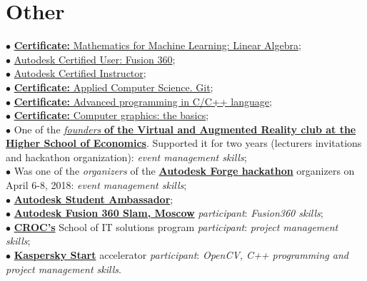 \documentclass[]{cv-class}
\begin{document}
\begin{minipage}[t]{0.6\textwidth}
\section{Other}
    \textcolor{bullet_col}{$\bullet$} \href{https://www.coursera.org/account/accomplishments/certificate/APDHC473Q5H7}{\textbf{Certificate:} Mathematics for Machine Learning: Linear Algebra}; \\
    \textcolor{bullet_col}{$\bullet$} \href{https://www.youracclaim.com/badges/e136c126-c834-408b-b380-beaa949e9180/public_url}{Autodesk Certified User: Fusion 360}; \\
    \textcolor{bullet_col}{$\bullet$} \href{https://www.youracclaim.com/badges/c0436850-b62e-45b4-95fa-6f1b49ca56b6/public_url}{Autodesk Certified Instructor}; \\
    \textcolor{bullet_col}{$\bullet$} \href{https://stepik.org/certificate/86b5b40faf74372730b30f98272ef8a9640ad069.pdf}{\textbf{Certificate:} Applied Computer Science. Git}; \\
    \textcolor{bullet_col}{$\bullet$} \href{https://stepik.org/certificate/93a178ba1662133d84ddb47bed17106eb4a4c8b2.pdf}{\textbf{Certificate:} Advanced programming in C/C++ language}; \\
    \textcolor{bullet_col}{$\bullet$} \href{https://stepik.org/certificate/ffb76dc11c287a0219ffb3e5aee43d2a104bcbb6.pdf}{\textbf{Certificate:} Computer graphics: the basics}; \\
    

    \textcolor{bullet_col}{$\bullet$} One of the \href{http://family.hse.ru/stud/view/391}{\textit{founders} \textbf{of the Virtual and Augmented Reality club at the Higher School of Economics}}. Supported it for two years (lecturers invitations and hackathon organization): \textit{event management skills}; \\
    \textcolor{bullet_col}{$\bullet$} Was one of the \textit{organizers} of the \href{https://www.hse.ru/ba/am/news/218387792.html}{\textbf{Autodesk Forge hackathon}} organizers on April 6-8, 2018: \textit{event management skills}; \\
    \textcolor{bullet_col}{$\bullet$} \href{https://academy.autodesk.com/users/n1kkys}{\textbf{Autodesk Student Ambassador}}; \\
    \textcolor{bullet_col}{$\bullet$} \href{https://youtu.be/k5R8RdXaOq4}{\textbf{Autodesk Fusion 360 Slam, Moscow}} \textit{participant}: \textit{Fusion360 skills}; \\
    \textcolor{bullet_col}{$\bullet$} \href{https://www.croc.ru/eng/}{\textbf{CROC's}} School of IT solutions program \textit{participant}: \textit{project management skills}; \\
    \textcolor{bullet_col}{$\bullet$} \href{https://kasperskystart.com}{\textbf{Kaspersky Start}} accelerator \textit{participant}: \textit{OpenCV, C++ programming and project management skills}.

\end{minipage}
\end{document}
